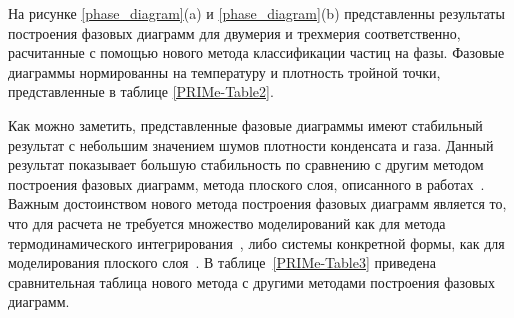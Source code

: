 На рисунке \ref{phase_diagram}(a) и \ref{phase_diagram}(b) представленны результаты построения фазовых диаграмм для двумерия и трехмерия соответственно, расчитанные с помощью нового метода классификации частиц на фазы.
Фазовые диаграммы нормированны на температуру и плотность тройной точки, представленные в таблице \ref{PRIMe-Table2}.

Как можно заметить, представленные фазовые диаграммы имеют стабильный результат с небольшим значением шумов плотности конденсата и газа.
Данный результат показывает большую стабильность по сравнению с другим методом построения фазовых диаграмм,  метода плоского слоя, описанного в работах~\cite{10.1021/jp806127j, 10.1021/jp1117213}.
Важным достоинством нового метода построения фазовых диаграмм является то, что для расчета не требуется множество моделирований как для метода термодинамического интегрирования~\cite{10.1080/00268976.2019.1699185}, либо системы конкретной формы, как для моделирования плоского слоя~\cite{10.1021/jp806127j, 10.1021/jp1117213}.
В таблице~\ref{PRIMe-Table3} приведена сравнительная таблица нового метода с другими методами построения фазовых диаграмм.


%



